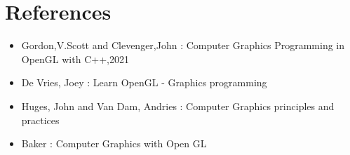 \documentclass[12pt]{article}
\begin{document}
\section{References}
\begin{itemize}
	\item Gordon,V.Scott and Clevenger,John : Computer Graphics Programming in OpenGL with C++,2021
	\item De Vries, Joey : Learn OpenGL - Graphics programming
	\item Huges, John and Van Dam, Andries : Computer Graphics principles and practices
	\item Baker : Computer Graphics with Open GL
\end{itemize}
\end{document}
